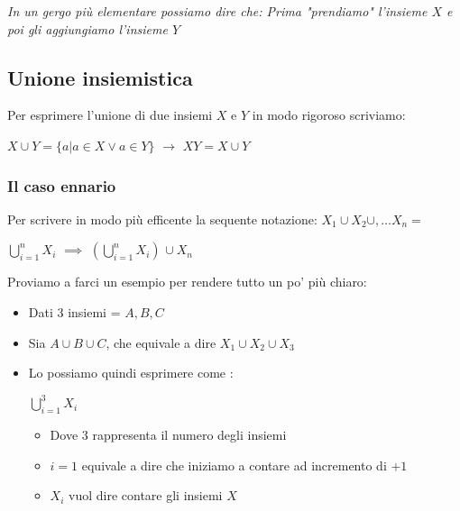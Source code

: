 \documentclass[article,12pt]{book}
\begin{document}
\begin{enumerate}
\begin{itemize}
\begin{center}
\begin{enumerate}
            \begin{center}
                \textit{In un gergo più elementare possiamo dire che: Prima "prendiamo" l'insieme $X$ e poi gli aggiungiamo l'insieme $Y$}
            \end{center}
        
        
        
        
        \end{enumerate}
    \end{center}
    \end{itemize}
\newpage

\subsection{Unione insiemistica}
Per esprimere l'unione di due insiemi $X$ e $Y$ in modo rigoroso scriviamo:
    \begin{center}
        \( X \cup Y = \{a | a \in X \lor a \in Y\} \) \(\rightarrow\) $XY = X \cup Y$
        
    \end{center}
\subsubsection{Il caso ennario} \label{unione ennaria} \label{generalizzare}
    Per scrivere in modo più efficente la sequente notazione: \( X_1 \cup X_2 \cup , \dots X_n =\)
    \begin{center}
        \(\bigcup_{i=1}^{n} X_i \) \(\implies\) \((\bigcup_{i=1}^{n} X  _i)\) \(\cup \ X_n\)
    \end{center}
Proviamo a farci un esempio per rendere tutto un po' più chiaro:
\begin{itemize}
    \item Dati 3 insiemi = $A,B,C$
    \item Sia \(A \cup B \cup C\), che equivale a dire \(X_1 \cup X_2 \cup X_3\)
    \item Lo possiamo quindi esprimere come : 
    \begin{center}
        \(\bigcup_{i=1}^{3} X_i \)
            \begin{itemize}
                \item Dove $3$ rappresenta il numero degli insiemi
                \item $i=1$ equivale a dire che iniziamo a contare ad incremento di $+1$
                \item $X_i$ vuol dire contare gli insiemi $X$
            \end{itemize}
    \end{center}
\end{itemize}

\end{enumerate}
\end{document}
